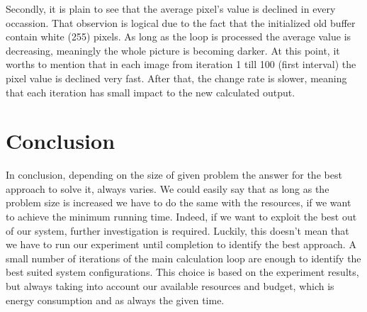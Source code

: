 \documentclass[12pt,a4paper]{article}
\newcommand{\sectionVspacing}{\vspace{15pt}}
\begin{document}
            Secondly, it is plain to see that the average pixel's value is declined in every occassion. That observion is logical due to the fact that the initialized old buffer contain white (255) pixels. As long as the loop is processed the average value is decreasing, meaningly the whole picture is becoming darker. At this point, it worths to mention that in each image from iteration 1 till 100 (first interval) the pixel value is declined very fast. After that, the change rate is slower, meaning that each iteration has small impact to the new calculated output.

\sectionVspacing

\section{Conclusion}
	In conclusion, depending on the size of given problem the answer for the best approach to solve it, always varies. We could easily say that as long as the problem size is increased we have to do the same with the resources, if we want to achieve the minimum running time. Indeed, if we want to exploit the best out of our system, further investigation is required. Luckily, this doesn't mean that we have to run our experiment until completion to identify the best approach. A small number of iterations of the main calculation loop are enough to identify the best suited system configurations. This choice is based on the experiment results, but always taking into account our available resources and budget, which is energy consumption and as always the given time.
\end{document}
